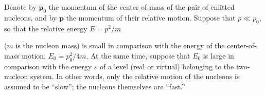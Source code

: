Denote by $\mathbf p_0$ the momentum of the center of mass of the pair of emitted nucleons, and by $\mathbf p$ the momentum of their relative motion. Suppose that $p\ll p_0$, so that the relative energy $E=p^2/m$

($m$ is the nucleon mass) is small in comparison with the energy of the center-of-mass motion, $E_0=p_0^2/4m$. At the same time, suppose that $E_0$ is large in comparison with the energy $\varepsilon$ of a level (real or virtual) belonging to the two-nucleon system. In other words, only the relative motion of the nucleons is assumed to be ``slow''; the nucleons themselves are ``fast.''
